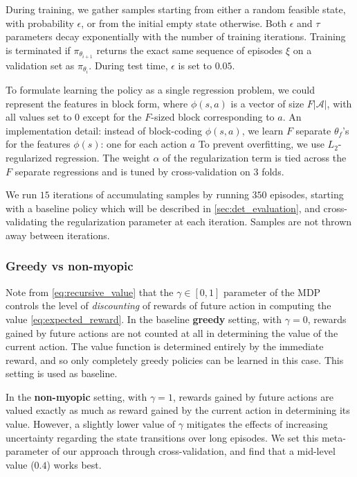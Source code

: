 During training, we gather samples starting from either a random feasible state, with probability $\epsilon$, or from the initial empty state otherwise.
Both $\epsilon$ and $\tau$ parameters decay exponentially with the number of training iterations.
Training is terminated if $\pi_{\theta_{i+1}}$ returns the exact same sequence of episodes $\xi$ on a validation set as $\pi_{\theta_{i}}$.
During test time, $\epsilon$ is set to $0.05$.

To formulate learning the policy as a single regression problem, we could represent the features in block form, where $\phi(s,a)$ is a vector of size $F|\mathcal{A}|$, with all values set to $0$ except for the $F$-sized block corresponding to $a$.
An implementation detail: instead of block-coding $\phi(s,a)$, we learn $F$ separate $\theta_f$'s for the features $\phi(s)$: one for each action $a$
To prevent overfitting, we use $L_2$-regularized regression.
The weight $\alpha$ of the regularization term is tied across the $F$ separate regressions and is tuned by cross-validation on 3 folds.

We run $15$ iterations of accumulating samples by running $350$ episodes, starting with a baseline policy which will be described in \autoref{sec:det_evaluation}, and cross-validating the regularization parameter at each iteration.
Samples are not thrown away between iterations.

\subsubsection{Greedy vs non-myopic}

Note from \autoref{eq:recursive_value} that the $\gamma \in [0,1]$ parameter of the MDP controls the level of \emph{discounting} of rewards of future action in computing the value \autoref{eq:expected_reward}.
In the baseline \textbf{greedy} setting, with $\gamma=0$, rewards gained by future actions are not counted at all in determining the value of the current action.
The value function is determined entirely by the immediate reward, and so only completely greedy policies can be learned in this case.
This setting is used as baseline.

In the \textbf{non-myopic} setting, with $\gamma=1$, rewards gained by future actions are valued exactly as much as reward gained by the current action in determining its value.
However, a slightly lower value of $\gamma$ mitigates the effects of increasing uncertainty regarding the state transitions over long episodes.
We set this meta-parameter of our approach through cross-validation, and find that a mid-level value ($0.4$) works best.
